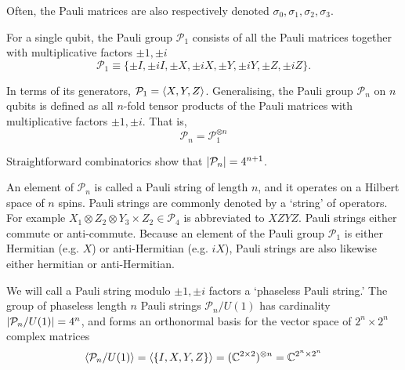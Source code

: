 \documentclass[10pt]{article}
\begin{document}
Often, the Pauli matrices are also respectively denoted $\sigma_0, \sigma_1, \sigma_2, \sigma_3$. 

For a single qubit, the Pauli group $\mathcal{P}_1$ consists of all the Pauli matrices together with multiplicative factors $\pm 1, \pm i$
\begin{equation}
\mathcal{P}_1 \equiv \{\pm I, \pm i I, \pm X, \pm i X, \pm Y, \pm i Y, \pm Z, \pm i Z\}.
\end{equation}

In terms of its generators, $\mathcal{P}_1 = \ev{X, Y, Z}$. Generalising, the Pauli group $\mathcal{P}_n$ on $n$ qubits is defined as all $n$-fold tensor products of the Pauli matrices with multiplicative factors $\pm 1, \pm i$. That is, 
\begin{equation}
\mathcal{P}_n = \mathcal{P}_1^{\otimes n}
\end{equation} 

Straightforward combinatorics show that $\abs{\mathcal{P}_n} = 4^{n+1}$.

An element of $\mathcal{P}_n$ is called a Pauli string of length $n$, and it operates on a Hilbert space of $n$ spins. Pauli strings are commonly denoted by a `string' of operators. For example $X_1 \otimes Z_2 \otimes Y_3 \times Z_2 \in \mathcal{P}_4$ is abbreviated to $XZYZ$. Pauli strings either commute or anti-commute. Because an element of the Pauli group $\mathcal{P}_1$ is either Hermitian (e.g. $X$) or anti-Hermitian (e.g. $iX$), Pauli strings are also likewise either hermitian or anti-Hermitian. 

\begin{comment}
A few properties are immediately obvious. Let $M,N \in S$. 

\begin{itemize}
\item Unitarity: $\forall M \in G_n$, $M$ satisfies $M^{-1} = M^\dagger$. 
\item (Anti/)Hermiticity: $\forall M \in G_n$, $M^2 = \pm I$; if $M^2 = I$, $M^\dagger = M$, else if $M^2 = -I$, $M^\dagger = -M$. Those in stabiliser group have $g^\dagger = g$.
\item (Anti/)Commutation: $\forall M, N \in G_n$, $MN = \pm NM$. Those in stabiliser group must commute.
\end{itemize}
\end{comment}

We will call a Pauli string modulo $\pm 1, \pm i$ factors a `phaseless Pauli string.' The group of phaseless length $n$ Pauli strings $\mathcal{P}_n/U(1)$ has cardinality $\abs{\mathcal{P}_n/U(1)} = 4^n$, and forms an orthonormal basis for the vector space of $2^n \times 2^n$ complex matrices
\begin{equation}
\ev{\mathcal{P}_n / U(1)}
= \ev{\{I, X, Y, Z\}} 
= (\mathbb{C}^{2\times2})^{\otimes n} 
= \mathbb{C}^{2^n\times2^n}
\end{equation}
\end{document}
